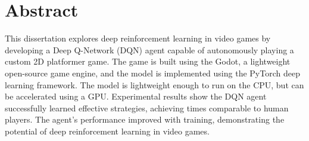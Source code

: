 
\chapter*{Abstract}

This dissertation explores deep reinforcement learning in video games by developing a Deep Q-Network (DQN) agent capable of autonomously playing a custom 2D platformer game. 
The game is built using the Godot, a lightweight open-source game engine, and the model is implemented using the PyTorch deep learning framework.
The model is lightweight enough to run on the CPU, but can be accelerated using a GPU.
Experimental results show the DQN agent successfully learned effective strategies, achieving times comparable to human players.
The agent's performance improved with training, demonstrating the potential of deep reinforcement learning in video games.
